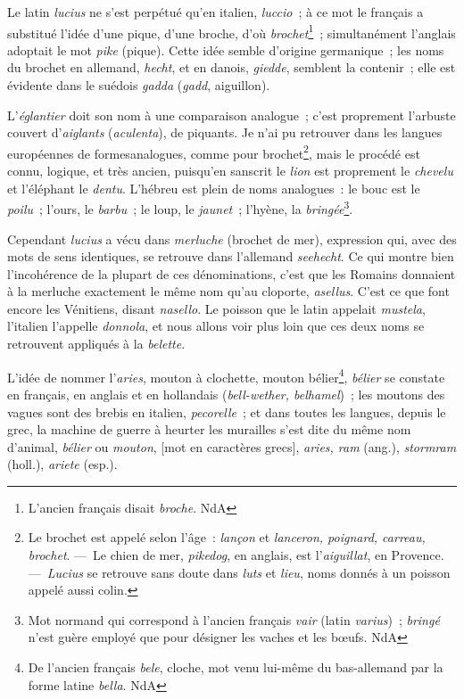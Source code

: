 \documentclass[french,twoside]{book} %
\begin{document}
\noindent Le latin {\itshape lucius} ne s’est perpétué qu’en italien, {\itshape luccio} ; à ce mot le français a substitué l’idée d’une pique, d’une broche, d’où {\itshape brochet}\footnote{ L’ancien français disait {\itshape broche}. NdA} ; simultanément l’anglais adoptait le mot {\itshape pike} (pique). Cette idée semble d’origine germanique ; les noms du brochet en allemand, {\itshape hecht}, et en danois, {\itshape giedde}, semblent la contenir ; elle est évidente dans le suédois {\itshape gadda} ({\itshape gadd}, aiguillon).\par
L’{\itshape églantier} doit son nom à une comparaison analogue ; c’est proprement l’arbuste couvert d’{\itshape aiglants} ({\itshape aculenta}), de piquants. Je n’ai pu retrouver dans les langues européennes de formesanalogues, comme pour brochet\footnote{Le brochet est appelé selon l’âge : {\itshape lançon} et {\itshape lanceron, poignard, carreau, brochet}. — Le chien de mer, {\itshape pikedog}, en anglais, est l’{\itshape aiguillat}, en Provence. — {\itshape Lucius} se retrouve sans doute dans {\itshape luts} et {\itshape lieu}, noms donnés à un poisson appelé aussi colin.}, mais le procédé est connu, logique, et très ancien, puisqu’en sanscrit le {\itshape lion} est proprement le {\itshape chevelu} et l’éléphant le {\itshape dentu}. L’hébreu est plein de noms analogues : le bouc est le {\itshape poilu} ; l’ours, le {\itshape barbu} ; le loup, le {\itshape jaunet} ; l’hyène, la {\itshape bringée}\footnote{ Mot normand qui correspond à l’ancien français {\itshape vair} (latin {\itshape varius}) ; {\itshape bringé} n’est guère employé que pour désigner les vaches et les bœufs. NdA}.\par
Cependant {\itshape lucius} a vécu dans {\itshape merluche} (brochet de mer), expression qui, avec des mots de sens identiques, se retrouve dans l’allemand {\itshape seehecht}. Ce qui montre bien l’incohérence de la plupart de ces dénominations, c’est que les Romains donnaient à la merluche exactement le même nom qu’au cloporte, {\itshape asellus}. C’est ce que font encore les Vénitiens, disant {\itshape nasello}. Le poisson que le latin appelait {\itshape mustela}, l’italien l’appelle {\itshape donnola}, et nous allons voir plus loin que ces deux noms se retrouvent appliqués à la {\itshape belette}.\par
L’idée de nommer l’{\itshape aries}, mouton à clochette, mouton bélier\footnote{ De l’ancien français {\itshape bele}, cloche, mot venu lui-même du bas-allemand par la forme latine {\itshape bella}. NdA}, {\itshape bélier} se constate en français, en anglais et en hollandais ({\itshape bell-wether, belhamel}) ; les moutons des vagues sont des brebis en italien, {\itshape pecorelle} ; et dans toutes les langues, depuis le grec, la machine de guerre à heurter les murailles s’est dite du même nom d’animal, {\itshape bélier} ou {\itshape mouton}, [mot en caractères grecs], {\itshape aries, ram} (ang.), {\itshape stormram} (holl.), {\itshape ariete} (esp.).\par
\end{document}

